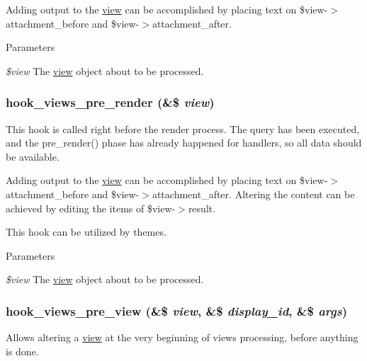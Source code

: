 Adding output to the \hyperlink{classview}{view} can be accomplished by placing text on \$view-\/$>$attachment\_\-before and \$view-\/$>$attachment\_\-after. 
\begin{DoxyParams}{Parameters}
\item[{\em \$view}]The \hyperlink{classview}{view} object about to be processed. \end{DoxyParams}
\hypertarget{group__views__hooks_gab88d5c49ec4ad30dba2be34327d5b0cc}{
\subsubsection[{hook\_\-views\_\-pre\_\-render}]{\setlength{\rightskip}{0pt plus 5cm}hook\_\-views\_\-pre\_\-render (\&\$ {\em view})}}
\label{group__views__hooks_gab88d5c49ec4ad30dba2be34327d5b0cc}
This hook is called right before the render process. The query has been executed, and the pre\_\-render() phase has already happened for handlers, so all data should be available.

Adding output to the \hyperlink{classview}{view} can be accomplished by placing text on \$view-\/$>$attachment\_\-before and \$view-\/$>$attachment\_\-after. Altering the content can be achieved by editing the items of \$view-\/$>$result.

This hook can be utilized by themes. 
\begin{DoxyParams}{Parameters}
\item[{\em \$view}]The \hyperlink{classview}{view} object about to be processed. \end{DoxyParams}
\hypertarget{group__views__hooks_ga471b90caa886a4e4239a839d6bf7a963}{
\subsubsection[{hook\_\-views\_\-pre\_\-view}]{\setlength{\rightskip}{0pt plus 5cm}hook\_\-views\_\-pre\_\-view (\&\$ {\em view}, \/  \&\$ {\em display\_\-id}, \/  \&\$ {\em args})}}
\label{group__views__hooks_ga471b90caa886a4e4239a839d6bf7a963}
Allows altering a \hyperlink{classview}{view} at the very beginning of views processing, before anything is done.

